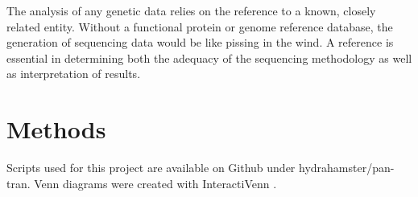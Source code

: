 \documentclass[12pt]{article}
\begin{document}

The analysis of any genetic data relies on the reference to a known, closely related entity. 
Without a functional protein or genome reference database, the generation of sequencing data would be like pissing in the wind. 
A reference is essential in determining both the adequacy of the sequencing methodology as well as interpretation of results. 
           




\newpage
\section*{Methods}
Scripts used for this project are available on Github under hydrahamster/pan-tran. 
Venn diagrams were created with InteractiVenn \cite{heberle2015venn}. 
\end{document}
